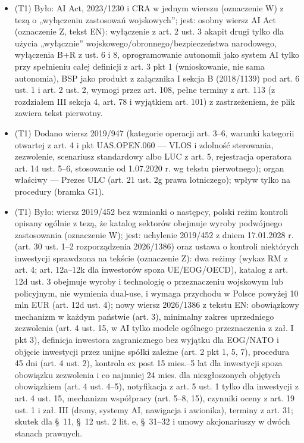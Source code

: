 \documentclass[12pt,a4paper]{report}
\begin{document}
\begin{itemize}
  \item (T1) Było: AI Act, 2023/1230 i CRA w jednym wierszu (oznaczenie W) z tezą o „wyłączeniu zastosowań wojskowych”; jest: osobny wiersz AI Act (oznaczenie Z, tekst EN): wyłączenie z art. 2 ust. 3 akapit drugi tylko dla użycia „wyłącznie” wojskowego/obronnego/bezpieczeństwa narodowego, wyłączenia B+R z ust. 6 i 8, oprogramowanie autonomii jako system AI tylko przy spełnieniu całej definicji z art. 3 pkt 1 (wnioskowanie, nie sama autonomia), BSP jako produkt z załącznika I sekcja B (2018/1139) pod art. 6 ust. 1 i art. 2 ust. 2, wymogi przez art. 108, pełne terminy z art. 113 (z rozdziałem III sekcja 4, art. 78 i wyjątkiem art. 101) z zastrzeżeniem, że plik zawiera tekst pierwotny.
  \item (T1) Dodano wiersz 2019/947 (kategorie operacji art. 3–6, warunki kategorii otwartej z art. 4 i pkt UAS.OPEN.060 — VLOS i zdolność sterowania, zezwolenie, scenariusz standardowy albo LUC z art. 5, rejestracja operatora art. 14 ust. 5–6, stosowanie od 1.07.2020 r. wg tekstu pierwotnego); organ właściwy — Prezes ULC (art. 21 ust. 2g prawa lotniczego); wpływ tylko na procedury (bramka G1).
  \item (T1) Było: wiersz 2019/452 bez wzmianki o następcy, polski reżim kontroli opisany ogólnie z tezą, że katalog sektorów obejmuje wyroby podwójnego zastosowania (oznaczenie W); jest: uchylenie 2019/452 z dniem 17.01.2028 r. (art. 30 ust. 1–2 rozporządzenia 2026/1386) oraz ustawa o kontroli niektórych inwestycji sprawdzona na tekście (oznaczenie Z): dwa reżimy (wykaz RM z art. 4; art. 12a–12k dla inwestorów spoza UE/EOG/OECD), katalog z art. 12d ust. 3 obejmuje wyroby i technologię o przeznaczeniu wojskowym lub policyjnym, nie wymienia dual-use, i wymaga przychodu w Polsce powyżej 10 mln EUR (art. 12d ust. 4); nowy wiersz 2026/1386 z tekstu EN: obowiązkowy mechanizm w każdym państwie (art. 3), minimalny zakres uprzedniego zezwolenia (art. 4 ust. 15, w AI tylko modele ogólnego przeznaczenia z zał. I pkt 3), definicja inwestora zagranicznego bez wyjątku dla EOG/NATO i objęcie inwestycji przez unijne spółki zależne (art. 2 pkt 1, 5, 7), procedura 45 dni (art. 4 ust. 2), kontrola ex post 15 mies.–5 lat dla inwestycji spoza obowiązku zezwolenia i co najmniej 24 mies. dla niezgłoszonych objętych obowiązkiem (art. 4 ust. 4–5), notyfikacja z art. 5 ust. 1 tylko dla inwestycji z art. 4 ust. 15, mechanizm współpracy (art. 5–8, 15), czynniki oceny z art. 19 ust. 1 i zał. III (drony, systemy AI, nawigacja i awionika), terminy z art. 31; skutek dla §~11, §~12 ust. 2 lit. e, §~31–32 i umowy akcjonariuszy w dwóch stanach prawnych.

\end{itemize}
\end{document}
